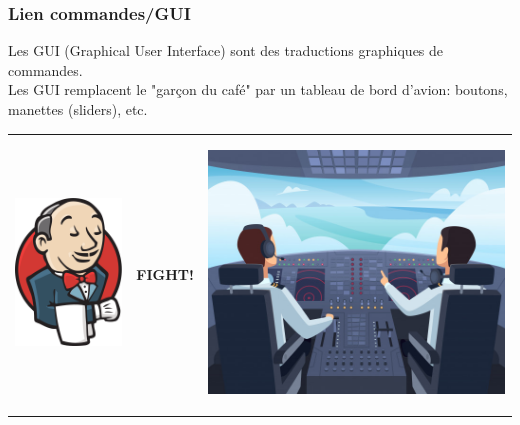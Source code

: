 \documentclass{beamer}
\begin{document}
\begin{frame}[fragile]
\frametitle{Lien commandes/GUI}
Les GUI (Graphical User Interface) sont des traductions graphiques de commandes.\\

Les GUI remplacent le "garçon du café" par un tableau de bord d'avion: boutons, manettes (sliders), etc.\\
\bigskip

\begin{tabular}{  m{9em} m{5em} m{10em}  }
    
    \begin{center}
        \includegraphics[scale=0.2]{images/Jenkins_logo.png}
    \end{center}
    & 
    \textbf{FIGHT!}
    &
    
    \begin{center}
        \includegraphics[scale=0.2]{images/cockpit.jpg}
    \end{center} \\
    
\end{tabular}

\end{frame}
\end{document}
